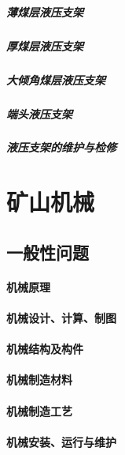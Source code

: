 \documentclass[UTF8]{../../ApplicationUniverse}
\begin{document}
            \paragraph{薄煤层液压支架}
            \paragraph{厚煤层液压支架}
            \paragraph{大倾角煤层液压支架}
            \paragraph{端头液压支架}
            \paragraph{液压支架的维护与检修}







\chapter{矿山机械}
\section{一般性问题}
    \subsubsection{机械原理}
    \subsubsection{机械设计、计算、制图}
    \subsubsection{机械结构及构件}
    \subsubsection{机械制造材料}
    \subsubsection{机械制造工艺}
    \subsubsection{机械安装、运行与维护}
\end{document}
